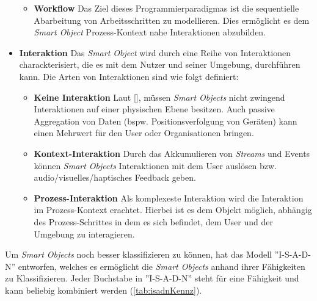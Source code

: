 \begin{itemize}
\begin{itemize}
        \item \textbf{Workflow} Das Ziel dieses Programmierparadigmas ist die sequentielle Abarbeitung von Arbeitsschritten zu modellieren. Dies ermöglicht es dem \textit{Smart Object} Prozess-Kontext nahe Interaktionen abzubilden.
    \end{itemize}
    \item \textbf{Interaktion} Das \textit{Smart Object} wird durch eine Reihe von Interaktionen charackterisiert, die es mit dem Nutzer und seiner Umgebung, durchführen kann. Die Arten von Interaktionen sind wie folgt definiert:
    \begin{itemize}
        \item \textbf{Keine Interaktion} Laut [\cite{mattern2010internet}], müssen \textit{Smart Objects} nicht zwingend Interaktionen auf einer physischen Ebene besitzen. Auch passive Aggregation von Daten (bspw. Positionsverfolgung von Geräten) kann einen Mehrwert für den User oder Organisationen bringen.
        \item \textbf{Kontext-Interaktion} Durch das Akkumulieren von \textit{Streams} und Events können \textit{Smart Objects} Interaktionen mit dem User auslösen bzw. audio/visuelles/haptisches Feedback geben. 
        \item \textbf{Prozess-Interaktion} Als komplexeste Interaktion wird die Interaktion im Prozess-Kontext erachtet. Hierbei ist es dem Objekt möglich, abhängig des Prozess-Schrittes in dem es sich befindet, dem User und der Umgebung zu interagieren.
    \end{itemize}
\end{itemize}
Um \textit{Smart Objects} noch besser klassifizieren zu können, hat \cite{lopez2011taxonomy} das Modell ''I-S-A-D-N'' entworfen, welches es ermöglicht die \textit{Smart Objects} anhand ihrer Fähigkeiten zu Klassifizieren. Jeder Buchstabe in ''I-S-A-D-N'' steht für eine Fähigkeit und kann beliebig kombiniert werden (\ref{tab:isadnKennz}). 
